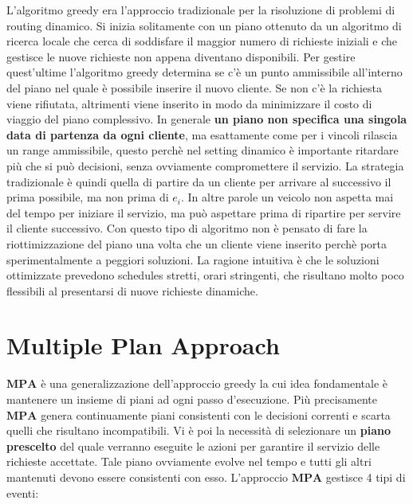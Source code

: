 \documentclass[
]{article}
\begin{document}
L'algoritmo greedy era l'approccio tradizionale per la risoluzione di
problemi di routing dinamico. Si inizia solitamente con un piano
ottenuto da un algoritmo di ricerca locale che cerca di soddisfare il
maggior numero di richieste iniziali e che gestisce le nuove richieste
non appena diventano disponibili. Per gestire quest'ultime
l'algoritmo greedy determina se c'è un punto ammissibile all'interno del
piano nel quale è possibile inserire il nuovo cliente. Se non c'è la
richiesta viene rifiutata, altrimenti viene inserito in modo da
minimizzare il costo di viaggio del piano complessivo. In generale \textbf{un
piano non specifica una singola data di partenza da ogni cliente}, ma
esattamente come per i vincoli rilascia un range ammissibile, questo
perchè nel setting dinamico è importante ritardare più che si può
decisioni, senza ovviamente compromettere il servizio. La strategia
tradizionale è quindi quella di partire da un cliente per arrivare al
successivo il prima possibile, ma non prima di {\(e_{i}\)}. In altre
parole un veicolo non aspetta mai del tempo per iniziare il servizio, ma
può aspettare prima di ripartire per servire il cliente successivo. Con
questo tipo di algoritmo non è pensato di fare la riottimizzazione del
piano una volta che un cliente viene inserito perchè porta
sperimentalmente a peggiori soluzioni. La ragione intuitiva è che le
soluzioni ottimizzate prevedono schedules stretti, orari stringenti, che
risultano molto poco flessibili al presentarsi di nuove richieste
dinamiche.

\hypertarget{multiple-plan-approach}{%
\section{Multiple Plan Approach}\label{multiple-plan-approach}}

{\(\mathbf{MPA}\)} è una generalizzazione dell'approccio
greedy la cui idea fondamentale è mantenere un insieme di piani ad ogni
passo d'esecuzione. Più precisamente {\(\mathbf{MPA}\)} genera
continuamente piani consistenti con le decisioni correnti e scarta
quelli che risultano incompatibili. Vi è poi la necessità di selezionare
un \textbf{piano prescelto} del quale verranno eseguite le azioni per
garantire il servizio delle richieste accettate. Tale piano ovviamente
evolve nel tempo e tutti gli altri mantenuti devono essere consistenti
con esso. L'approccio {\(\mathbf{MPA}\)} gestisce 4 tipi di eventi:
\end{document}
